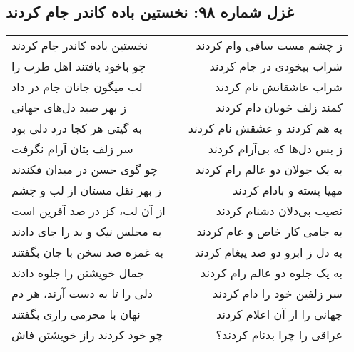 \begin{center}
\section*{غزل شماره ۹۸: نخستین باده کاندر جام کردند}
\label{sec:098}
\begin{longtable}{l p{0.5cm} r}
نخستین باده کاندر جام کردند
&&
ز چشم مست ساقی وام کردند
\\
چو باخود یافتند اهل طرب را
&&
شراب بیخودی در جام کردند
\\
لب میگون جانان جام در داد
&&
شراب عاشقانش نام کردند
\\
ز بهر صید دل‌های جهانی
&&
کمند زلف خوبان دام کردند
\\
به گیتی هر کجا درد دلی بود
&&
به هم کردند و عشقش نام کردند
\\
سر زلف بتان آرام نگرفت
&&
ز بس دل‌ها که بی‌آرام کردند
\\
چو گوی حسن در میدان فکندند
&&
به یک جولان دو عالم رام کردند
\\
ز بهر نقل مستان از لب و چشم
&&
مهیا پسته و بادام کردند
\\
از آن لب، کز در صد آفرین است
&&
نصیب بی‌دلان دشنام کردند
\\
به مجلس نیک و بد را جای دادند
&&
به جامی کار خاص و عام کردند
\\
به غمزه صد سخن با جان بگفتند
&&
به دل ز ابرو دو صد پیغام کردند
\\
جمال خویشتن را جلوه دادند
&&
به یک جلوه دو عالم رام کردند
\\
دلی را تا به دست آرند، هر دم
&&
سر زلفین خود را دام کردند
\\
نهان با محرمی رازی بگفتند
&&
جهانی را از آن اعلام کردند
\\
چو خود کردند راز خویشتن فاش
&&
عراقی را چرا بدنام کردند؟
\\
\end{longtable}
\end{center}
